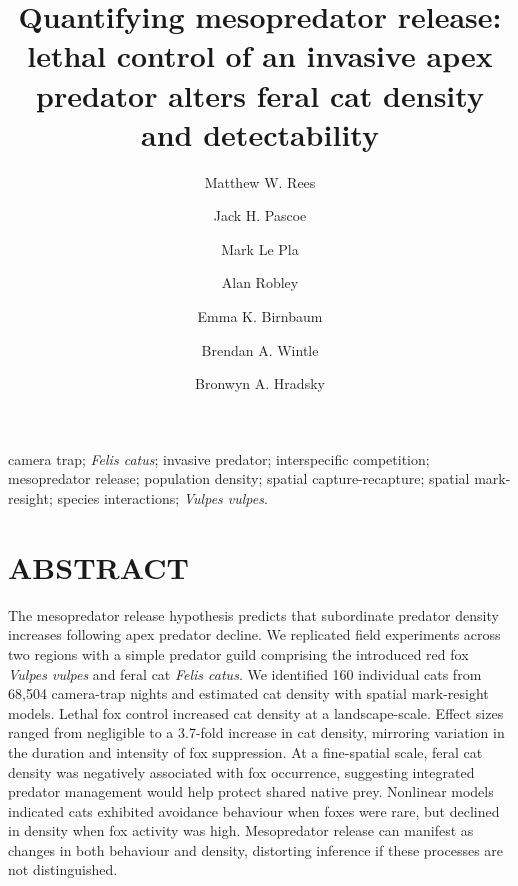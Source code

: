 \documentclass[]{elsarticle} %
\begin{document}
\begin{frontmatter}

  \title{Quantifying mesopredator release: lethal control of an invasive apex predator alters feral cat density and detectability}
    \author[UOM]{Matthew W. Rees}
    \author[CEC]{Jack H. Pascoe}
  
    \author[CEC]{Mark Le Pla}
  
    \author[ARI]{Alan Robley}
  
    \author[CEC]{Emma K. Birnbaum}
  
    \author[UOM]{Brendan A. Wintle}
  
    \author[UOM]{Bronwyn A. Hradsky}
  
      \address[UOM]{Quantitative \& Applied Ecology Group, School of Ecosystem and Forest Science, The University of Melbourne, Parkville, VIC, Australia}
    \address[CEC]{Conservation Ecology Centre, Otway Lighthouse Rd, Cape Otway, VIC, Australia}
    \address[ARI]{Department of Environment, Land, Water and Planning, Arthur Rylah Institute for Environmental Research, Heidelberg, Australia}
  
  \begin{abstract}
  
  \end{abstract}
   \begin{keyword} camera trap; \emph{Felis catus}; invasive predator; interspecific competition; mesopredator release; population density; spatial capture-recapture; spatial mark-resight; species interactions; \emph{Vulpes vulpes}.\end{keyword}
 \end{frontmatter}

\parskip=12pt

\newpage

\hypertarget{abstract}{%
\section*{ABSTRACT}\label{abstract}}

The mesopredator release hypothesis predicts that subordinate predator density increases following apex predator decline. We replicated field experiments across two regions with a simple predator guild comprising the introduced red fox \emph{Vulpes vulpes} and feral cat \emph{Felis catus}. We identified 160 individual cats from 68,504 camera-trap nights and estimated cat density with spatial mark-resight models. Lethal fox control increased cat density at a landscape-scale. Effect sizes ranged from negligible to a 3.7-fold increase in cat density, mirroring variation in the duration and intensity of fox suppression. At a fine-spatial scale, feral cat density was negatively associated with fox occurrence, suggesting integrated predator management would help protect shared native prey. Nonlinear models indicated cats exhibited avoidance behaviour when foxes were rare, but declined in density when fox activity was high. Mesopredator release can manifest as changes in both behaviour and density, distorting inference if these processes are not distinguished.
\end{document}
